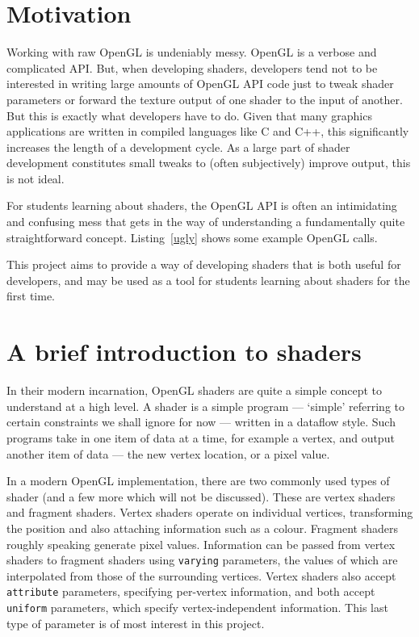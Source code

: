 \documentclass[12pt,twoside,notitlepage]{report}
\begin{document}
\section{Motivation}
Working with raw OpenGL is undeniably messy. OpenGL is a verbose and complicated API. But, when developing shaders, developers tend not to be interested in writing large amounts of OpenGL API code just to tweak shader parameters or forward the texture output of one shader to the input of another. But this is exactly what developers have to do. Given that many graphics applications are written in compiled languages like C and C++, this significantly increases the length of a development cycle. As a large part of shader development constitutes small tweaks to (often subjectively) improve output, this is not ideal.

For students learning about shaders, the OpenGL API is often an intimidating and confusing mess that gets in the way of understanding a fundamentally quite straightforward concept. Listing~\ref{ugly} shows some example OpenGL calls.

This project aims to provide a way of developing shaders that is both useful for developers, and may be used as a tool for students learning about shaders for the first time.
\section{A brief introduction to shaders}
\label{brief}
In their modern incarnation, OpenGL shaders are quite a simple concept to understand at a high level. A shader is a simple program --- `simple' referring to certain constraints we shall ignore for now --- written in a dataflow style. Such programs take in one item of data at a time, for example a vertex, and output another item of data --- the new vertex location, or a pixel value.

In a modern OpenGL implementation, there are two commonly used types of shader (and a few more which will not be discussed). These are vertex shaders and fragment shaders. Vertex shaders operate on individual vertices, transforming the position and also attaching information such as a colour. Fragment shaders roughly speaking generate pixel values. Information can be passed from vertex shaders to fragment shaders using \texttt{varying} parameters, the values of which are interpolated from those of the surrounding vertices. Vertex shaders also accept \texttt{attribute} parameters, specifying per-vertex information, and both accept \texttt{uniform} parameters, which specify vertex-independent information. This last type of parameter is of most interest in this project.
\end{document}
